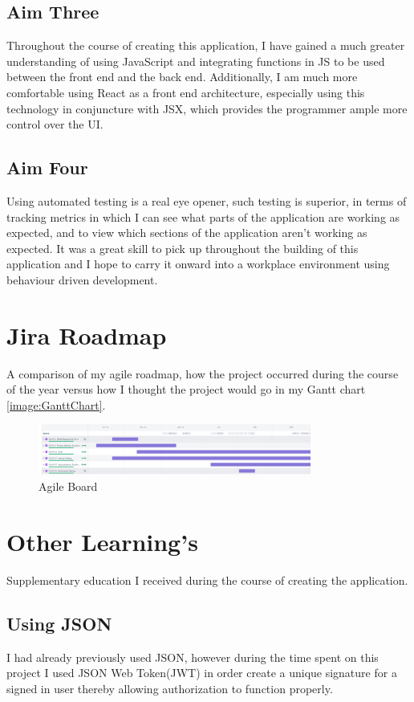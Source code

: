 \subsection{Aim Three}
Throughout the course of creating this application, I have gained a much greater understanding of using JavaScript and integrating functions in JS to be used between the front end and the back end. Additionally, I am much more comfortable using React as a front end architecture, especially using this technology in conjuncture with JSX, which provides the programmer ample more control over the UI. 

\subsection{Aim Four}
Using automated testing is a real eye opener, such testing is superior, in terms of tracking metrics in which I can see what parts of the application are working as expected, and to view which sections of the application aren't working as expected. It was a great skill to pick up throughout the building of this application and I hope to carry it onward into a workplace environment using behaviour driven development.

\newpage
\section{Jira Roadmap}
A comparison of my agile roadmap, how the project occurred during the course of the year versus how I thought the project would go in my Gantt chart \ref{image:GanttChart}.
\begin{figure}[h!]
    \centering
    \includegraphics[width=0.8\textwidth]{images/AgileBoard.png}
    \caption{Agile Board}
    \label{image:AgileBoard}
\end{figure}


\section{Other Learning's}
Supplementary education I received during the course of creating the application.

\subsection{Using JSON}
I had already previously used JSON, however during the time spent on this project I used JSON Web Token(JWT) in order create a unique signature for a signed in user thereby allowing authorization to function properly.

